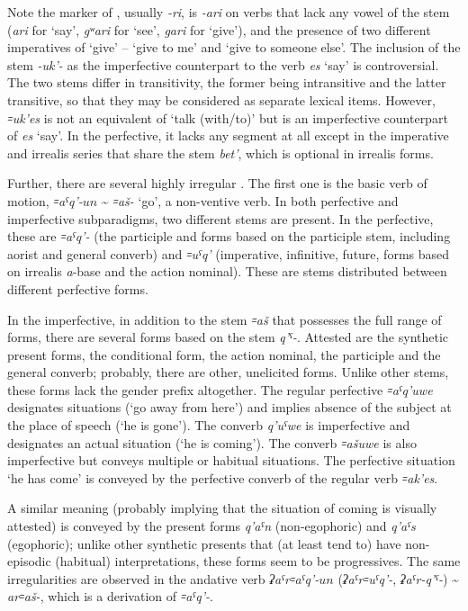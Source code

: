 \documentclass[output=paper]{langsci/langscibook}
\begin{document}
Note the marker of , usually \emph{-ri}, is
\emph{-ari} on verbs that lack any vowel of the stem (\emph{ari} for
`say', \emph{gʷari} for `see', \emph{gari} for `give'), and the presence
of two different imperatives of `give' – `give to me' and `give to
someone else'. The inclusion of the stem \emph{-uk'-} as the
imperfective counterpart to the verb \emph{es} `say' is controversial.
The two stems differ in transitivity, the former being intransitive and
the latter transitive, so that they may be considered as separate
lexical items. However, \emph{꞊uk'es} is not an equivalent of `talk
(with/to)' but is an imperfective counterpart of \emph{es} `say'. In the
perfective, it lacks any segment at all except in the imperative and
irrealis series that share the stem \emph{bet'}, which is 
optional in irrealis forms.

Further, there are several highly irregular . The first one
is the basic verb of motion, \emph{꞊aˤq'-\(un\)} \textasciitilde{}
\emph{꞊aš-} `go', a non-ventive verb. In both perfective and
imperfective subparadigms, two different stems are present. In the
perfective, these are \emph{꞊aˤq'-} (the participle and forms based on
the participle stem, including aorist and general converb) and
\emph{꞊uˤq'} (imperative, infinitive, future, forms based on irrealis
\emph{a}-base and the action nominal). These are stems distributed
between different perfective forms.


In the imperfective, in addition to the stem \emph{꞊aš} that possesses
the full range of forms, there are several forms based on the stem
\emph{q'ˤ-}. Attested are the synthetic present forms, the conditional
form, the action nominal, the participle and the general converb;
probably, there are other, unelicited forms. Unlike other stems, these
forms lack the gender prefix altogether. The regular perfective
\emph{꞊aˤq'uwe} designates  situations (`go away from here') and
implies absence of the subject at the place of speech (`he is gone').
The converb \emph{q'uˤwe} is imperfective and designates an actual
 situation (`he is coming'). The converb \emph{꞊ašuwe} is also
imperfective but conveys multiple or habitual situations. The perfective
situation `he has come' is conveyed by the perfective converb of the
regular verb \emph{꞊ak'es}.

A similar meaning (probably implying that the situation of coming is
visually attested) is conveyed by the present forms \emph{q'aˤn}
(non-egophoric) and \emph{q'aˤs} (egophoric); unlike other synthetic
presents that (at least tend to) have non-episodic (habitual)
interpretations, these forms seem to be progressives. The same
irregularities are observed in the andative verb
\emph{ʡaˤr꞊aˤq'-\(un\)} (\emph{ʡaˤr꞊uˤq'-}, \emph{ʡaˤr-q'ˤ-})
\textasciitilde{} \emph{ar꞊aš-}, which is a derivation of \emph{꞊aˤq'-}.
\end{document}
